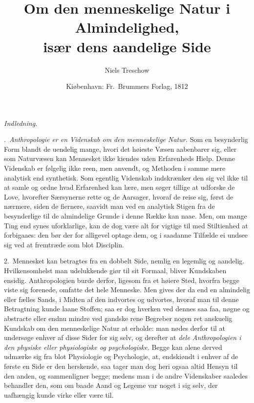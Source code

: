 \documentclass[12pt,a4paper]{article}
\title{\textbf{Om den menneskelige Natur i Almindelighed,}\\[4pt]
  \large især dens aandelige Side}
\author{Niels Treschow}
\date{\small Kiøbenhavn: Fr.\ Brummers Forlag, 1812}
\newcommand{\afsnit}[1]{%
  \bigskip\begin{center}{\Large \emph{#1}}\end{center}\smallskip}
\newcommand{\opage}[1]{\marginnote{\footnotesize\textit{[#1]}}}
\begin{document}
\maketitle
\thispagestyle{fancy}

\bigskip


\afsnit{Indledning.}

\opage{1} .~\emph{Anthropologie er en Videnskab om den menneskelige Natur.} Som en
besynderlig Form blandt de uendelig mange, hvori det høieste Væsen aabenbarer
sig, eller som Naturvæsen kan Mennesket ikke kiendes uden Erfarenheds Hielp.
Denne Videnskab er følgelig ikke reen, men anvendt, og Methoden i samme mere
analytisk end synthetisk. Som egentlig Videnskab indskrænker den sig vel ikke til
at samle og ordne hvad Erfarenhed kan lære, men søger tillige at udforske de
Love, hvorefter Særsynerne rette og de Aarsager, hvoraf de reise sig, først de
nærmere, siden de fiernere, saavidt man ved en analytisk Stigen fra de
besynderlige til de almindelige Grunde i denne Række kan naae. Men, om mange Ting
end synes uforklarlige, kan de dog være alt for vigtige til med Stiltienhed at
forbigaaes: den bør der%
\opage{2}for alligevel optage dem, og i saadanne Tilfælde ei undsee sig ved at fremtræde
som blot Disciplin.

2.~Mennesket kan betragtes fra en dobbelt Side, nemlig en legemlig og aandelig.
Hvilkensomhelst man udelukkende giør til sit Formaal, bliver Kundskaben ensidig.
Anthropologien burde derfor, ligesom fra et høiere Sted, hvorfra begge viste sig
forenede, omfatte det hele Menneske. Men gives der da end en almindelig eller
fælles Sands, i Midten af den indvortes og udvortes, hvoraf man til denne
Betragtning kunde laane Stoffen; saa er dog hverken ved dennes saa faa, nøgne og
abstracte eller endnu mindre ved gandske rene Begreber nogen ret anskuelig
Kundskab om den menneskelige Natur at erholde: man nødes derfor til at undersøge
enhver af disse Sider for sig selv, og derefter at \emph{dele Anthropologien i
den physiske eller physiologiske og psychologiske.} Begge kan alene derved
udmærke sig fra blot Physiologie og Psychologie, at, endskiøndt i enhver af de
første en Side er den herskende, saa tager man dog heri ogsaa altid Hensyn til
den anden, og sammenligner begge; medens man i de andre Videnskaber saaledes
behandler den, som om baade Aand og Legeme var noget i sig selv, der uafhængig
kunde virke eller være til.
\end{document}

